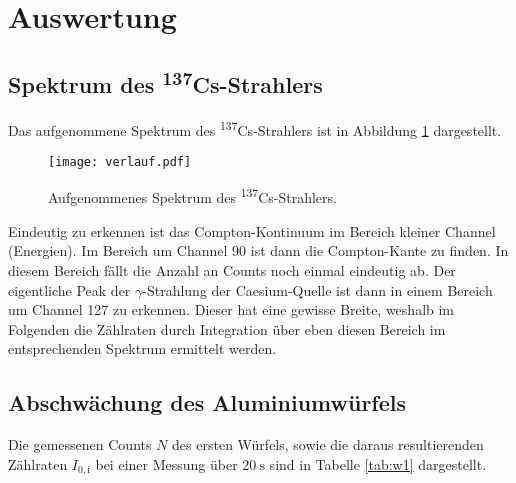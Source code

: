 \section{Auswertung}
\label{sec:Auswertung}

\subsection{Spektrum des \textsuperscript{137}Cs-Strahlers}

Das aufgenommene Spektrum des \textsuperscript{137}Cs-Strahlers ist in Abbildung
\ref{fig:verlauf} dargestellt.

\begin{figure}[H]
  \centering
  \texttt{[image: verlauf.pdf]}
  \caption{Aufgenommenes Spektrum des \textsuperscript{137}Cs-Strahlers.}
  \label{fig:verlauf}
\end{figure}

Eindeutig zu erkennen ist das Compton-Kontinuum im Bereich kleiner Channel (Energien).
Im Bereich um Channel $90$ ist dann die Compton-Kante zu finden. In diesem Bereich
fällt die Anzahl an Counts noch einmal eindeutig ab. Der eigentliche Peak der $\gamma$-Strahlung der Caesium-Quelle
ist dann in einem Bereich um Channel 127 zu erkennen. Dieser hat eine gewisse Breite,
weshalb im Folgenden die Zählraten durch Integration über eben diesen Bereich im
entsprechenden Spektrum ermittelt werden.

\subsection{Abschwächung des Aluminiumwürfels}
Die gemessenen Counts $N$ des ersten Würfels, sowie die daraus resultierenden Zählraten  $I_{0,\mathrm{i}}$ bei einer Messung
über $\SI{20}{\second}$ sind in Tabelle \ref{tab:w1} dargestellt.

